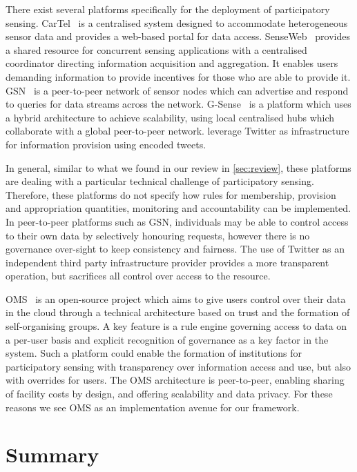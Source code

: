 There exist several platforms specifically for the deployment of participatory sensing. 
CarTel~\citep{Hull2006} is a centralised system designed to accommodate heterogeneous sensor data and provides a web-based portal for data access. 
SenseWeb~\citep{Kansal2007} provides a shared resource for concurrent sensing applications with a centralised coordinator directing information acquisition and aggregation. 
It enables users demanding information to provide incentives for those who are able to provide it. 
\ac{GSN}~\citep{Aberer2006} is a peer-to-peer network of sensor nodes which can advertise and respond to queries for data streams across the network. 
G-Sense~\citep{Perez2010} is a platform which uses a hybrid architecture to achieve scalability, using local centralised hubs which collaborate with a global peer-to-peer network. 
 leverage Twitter as infrastructure for information provision using encoded tweets.

In general, similar to what we found in our review in \autoref{sec:review}, these platforms are dealing with a particular technical challenge of participatory sensing. 
Therefore, these platforms do not specify how rules for membership, provision and appropriation quantities, monitoring and accountability can be implemented. 
In peer-to-peer platforms such as \ac{GSN}, individuals may be able to control access to their own data by selectively honouring requests, however there is no governance over-sight to keep consistency and fairness. 
The use of Twitter as an independent third party infrastructure provider provides a more transparent operation, but sacrifices all control over access to the resource.

\ac{OMS}~\citep{Hardjono2014,Hardjono2014a} is an open-source project which aims to give users control over their data in the cloud through a technical architecture based on trust and the formation of self-organising groups. 
A key feature is a rule engine governing access to data on a per-user basis and explicit recognition of governance as a key factor in the system.
Such a platform could enable the formation of institutions for participatory sensing with transparency over information access and use, but also with overrides for users. 
The \ac{OMS} architecture is peer-to-peer, enabling sharing of facility costs by design, and offering scalability and data privacy. 
For these reasons we see \ac{OMS} as an implementation avenue for our framework.

\section{Summary}\label{sec:conclude}

